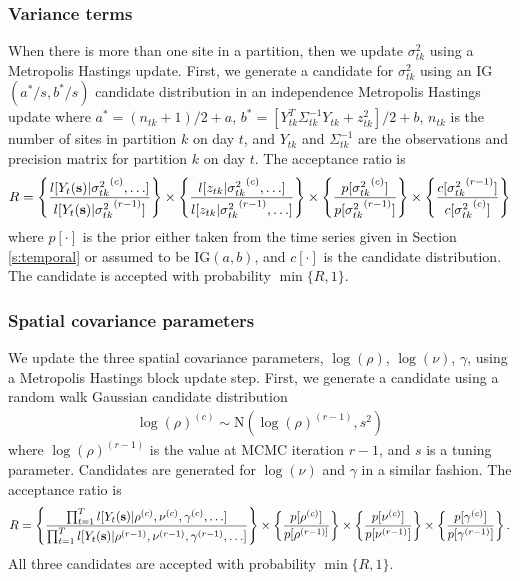 \documentclass[11pt]{article}
\begin{document}
\subsubsection*{Variance terms}
When there is more than one site in a partition, then we update $\sigma^2_{tk}$ using a Metropolis Hastings update.
First, we generate a candidate for $\sigma^2_{tk}$ using an IG$(a^*/s, b^*/s)$ candidate distribution in an independence Metropolis Hastings update where $a^* = (n_{tk} + 1) / 2 + a$, $b^* = [Y_{tk}^T \Sigma^{-1}_{tk} Y_{tk} + z_{tk}^2] / 2 + b$, $n_{tk}$ is the number of sites in partition $k$ on day $t$, and $Y_{tk}$ and $\Sigma^{-1}_{tk}$ are the observations and precision matrix for partition $k$ on day $t$.
The acceptance ratio is
\begin{align*}
  R = \left\{
    \frac{ l[Y_t(\mbox{\bf s}) | {\sigma^2_{tk}}^{(c)}, \ldots] }
         { l[Y_t(\mbox{\bf s}) | {\sigma^2_{tk}}^{(r - 1)}]}
    \right\} \times \left\{
    \frac{ l[z_{tk} | {\sigma^2_{tk}}^{(c)}, \ldots] }
         { l[z_{tk} | {\sigma^2_{tk}}^{(r - 1)}, \ldots] }
    \right\} \times \left\{
    \frac{ p[ {\sigma^2_{tk}}^{(c)} ] }
         { p[ {\sigma^2_{tk}}^{(r - 1)}] }
    \right\} \times \left\{
    \frac{ c[ {\sigma^2_{tk}}^{(r - 1)}] }
         { c[ {\sigma^2_{tk}}^{(c)}]}
    \right\}
\end{align*}
where $p[\cdot]$ is the prior either taken from the time series given in Section \ref{s:temporal} or assumed to be IG$(a, b)$, and $c[\cdot]$ is the candidate distribution.
The candidate is accepted with probability $\min\{R, 1\}$.

\subsubsection*{Spatial covariance parameters}
We update the three spatial covariance parameters, $\log(\rho)$, $\log(\nu)$, $\gamma$, using a Metropolis Hastings block update step.
First, we generate a candidate using a random walk Gaussian candidate distribution
\begin{align*}
	\log(\rho)^{(c)} \sim \text{N}(\log(\rho)^{(r - 1)}, s^2)
\end{align*}
where $\log(\rho)^{(r-1)}$ is the value at MCMC iteration $r - 1$, and $s$ is a tuning parameter.
Candidates are generated for $\log(\nu)$ and $\gamma$ in a similar fashion.
The acceptance ratio is
\begin{align*}
	R = \left\{ \frac{ \prod_{t = 1}^{T} l[Y_t(\mbox{\bf s}) | \rho^{(c)}, \nu^{(c)}, \gamma^{(c)}, \ldots] }{\prod_{t = 1}^{T} l[Y_t(\mbox{\bf s}) | \rho^{(r-1)}, \nu^{(r-1)}, \gamma^{(r-1)}, \ldots] } \right\} \times \left\{ \frac{ p[\rho^{(c)}] }{ p[\rho^{(r - 1)] } } \right\} \times \left\{ \frac{ p[\nu^{(c)}] }{ p[\nu^{(r - 1)}] } \right\} \times \left\{ \frac{ p[ \gamma^{(c)} ] }{ p[\gamma^{(r - 1)} ] } \right\}.
\end{align*}
All three candidates are accepted with probability $\min\{R, 1\}$.
\end{document}
